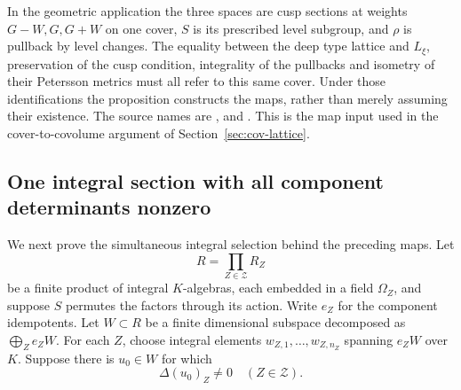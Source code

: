 In the geometric application the three spaces are cusp sections at
weights \(G-W,G,G+W\) on one cover, \(S\) is its prescribed level
subgroup, and \(\rho\) is pullback by level changes.
The equality between the deep type lattice and \(L_\xi\), preservation
of the cusp condition, integrality of the pullbacks and isometry of
their Petersson metrics must all refer to this same cover.
Under those identifications the proposition constructs the maps,
rather than merely assuming their existence.
The source names are ,
and .
This is the map input used in the cover-to-covolume argument of
Section~\ref{sec:cov-lattice}.

\subsection{One integral section with all component determinants nonzero}
\label{sec:sr-bounded-determinant-selection}

We next prove the simultaneous integral selection behind the preceding
maps.  Let
\[
                      R=\prod_{Z\in\mathcal Z}R_Z
\]
be a finite product of integral \(K\)-algebras, each embedded in a
field \(\Omega_Z\), and suppose \(S\) permutes the factors through
its action.  Write \(e_Z\) for the component idempotents.
Let \(W\subset R\) be a finite dimensional subspace decomposed as
\(\bigoplus_Z e_ZW\).
For each \(Z\), choose integral elements
\(w_{Z,1},\ldots,w_{Z,n_Z}\) spanning \(e_ZW\) over \(K\).
Suppose there is \(u_0\in W\) for which
\[
                       \Delta(u_0)_Z\ne0\quad(Z\in\mathcal Z).
\]

